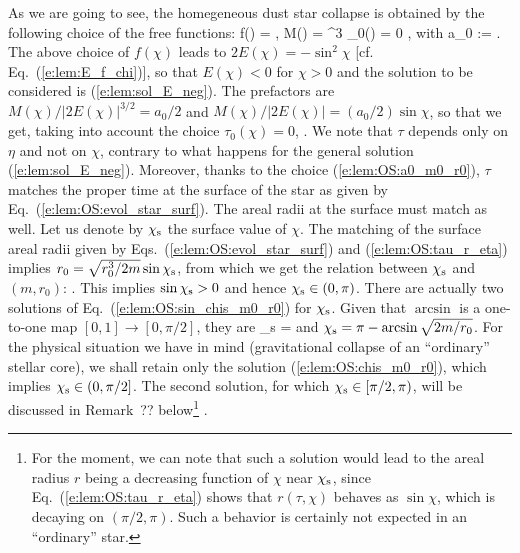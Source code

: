 As we are going to see, the homegeneous dust star collapse is obtained by the
following choice of the free functions:
\be \label{e:lem:OS:free_func}
    f(\chi) = \cos\chi,\qquad
    M(\chi) =  \sin^3\chi
    \qand \tau_0(\chi) = 0 ,
\ee
with
\be \label{e:lem:OS:a0_m0_r0}
    a_0 :=  .
\ee
The above choice of $f(\chi)$ leads to $2 E(\chi) = -\sin^2\chi$
[cf. Eq.~(\ref{e:lem:E_f_chi})], so that $E(\chi) < 0$ for $\chi>0$
and the solution to be considered is (\ref{e:lem:sol_E_neg}).
The prefactors are $M(\chi)/|2E(\chi)|^{3/2} = a_0/2$ and
$M(\chi)/|2E(\chi)| = (a_0/2) \sin\chi$, so that we get, taking into account
the choice $\tau_0(\chi) = 0$,
\be \label{e:lem:OS:tau_r_eta}
     \leq \eta \leq \pi .
\ee
We note that $\tau$ depends only on $\eta$ and not on $\chi$, contrary
to what happens for the general solution (\ref{e:lem:sol_E_neg}). Moreover, thanks to the choice
(\ref{e:lem:OS:a0_m0_r0}), $\tau$ matches the proper time at the surface
of the star as given by Eq.~(\ref{e:lem:OS:evol_star_surf}).
The areal radii at the surface must match as well. Let us denote by
$\chi_{\rm s}$ the surface value of $\chi$. The
matching of the surface areal radii given by Eqs.~(\ref{e:lem:OS:evol_star_surf})
and (\ref{e:lem:OS:tau_r_eta}) implies $r_0 = \sqrt{r_0^3/2m}\sin\chi_{\rm s}$,
from which we get the relation between $\chi_{\rm s}$ and
$(m, r_0)$:
\be \label{e:lem:OS:sin_chis_m0_r0}
    .
\ee
This implies $\sin\chi_{\rm s} > 0$ and hence $\chi_{\rm s} \in (0,\pi)$.
There are actually two solutions of Eq.~(\ref{e:lem:OS:sin_chis_m0_r0})
for $\chi_{\rm s}$.
Given that $\arcsin$ is a one-to-one map $[0,1] \to [0,\pi/2]$, they are
\be \label{e:lem:OS:chis_m0_r0}
    \chi_{\rm s} = \arcsin{}
\ee
and $\chi_{\rm s} = \pi - \arcsin\sqrt{2 m/r_0}$.
For the physical situation we have in mind (gravitational collapse of an ``ordinary'' stellar core),
we shall retain only the solution (\ref{e:lem:OS:chis_m0_r0}), which implies $\chi_{\rm s} \in (0, \pi/2]$.
The second solution, for which $\chi_{\rm s} \in [\pi/2, \pi)$,    %
will be discussed in Remark~?? below\footnote{For the moment, we can note that such a solution
would lead to the areal radius $r$ being a decreasing function of $\chi$ near $\chi_{\rm s}$,
since Eq.~(\ref{e:lem:OS:tau_r_eta}) shows that $r(\tau,\chi)$ behaves as $\sin\chi$, which is decaying
on $(\pi/2,\pi)$. Such a behavior is certainly not expected in an ``ordinary'' star.} .
